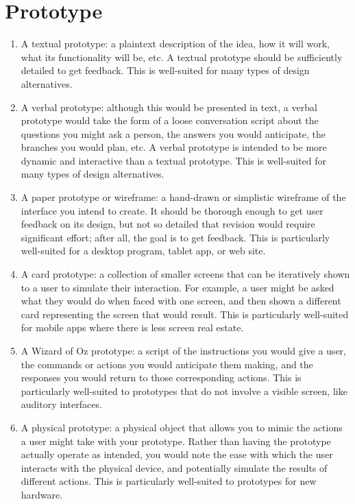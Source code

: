 \clearpage


\section{Prototype}

\begin{enumerate}
\item
  A textual prototype: a plaintext description of the idea, how it will work, what its functionality will be, etc. A textual prototype should be sufficiently detailed to get feedback. This is well-suited for many types of design alternatives.
\item
  A verbal prototype: although this would be presented in text, a verbal prototype would take the form of a loose conversation script about the questions you might ask a person, the answers you would anticipate, the branches you would plan, etc. A verbal prototype is intended to be more dynamic and interactive than a textual prototype. This is well-suited for many types of design alternatives.
\item
  A paper prototype or wireframe: a hand-drawn or simplistic wireframe of the interface you intend to create. It should be thorough enough to get user feedback on its design, but not so detailed that revision would require significant effort; after all, the goal is to get feedback. This is particularly well-suited for a desktop program, tablet app, or web site.
\item
  A card prototype: a collection of smaller screens that can be iteratively shown to a user to simulate their interaction. For example, a user might be asked what they would do when faced with one screen, and then shown a different card representing the screen that would result. This is particularly well-suited for mobile apps where there is less screen real estate.
\item
  A Wizard of Oz prototype: a script of the instructions you would give a user, the commands or actions you would anticipate them making, and the responses you would return to those corresponding actions. This is particularly well-suited to prototypes that do not involve a visible screen, like auditory interfaces.
\item
  A physical prototype: a physical object that allows you to mimic the actions a user might take with your prototype. Rather than having the prototype actually operate as intended, you would note the ease with which the user interacts with the physical device, and potentially simulate the results of different actions. This is particularly well-suited to prototypes for new hardware.
\end{enumerate}


